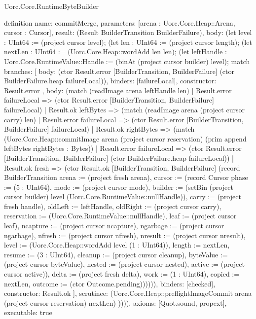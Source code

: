 \begin{lexlean}{Uorc.Core.RuntimeByteBuilder}
\begin{semanticmodule}
definition{
  name: commitMerge,
  parameters: [arena : Uorc.Core.Heap::Arena, cursor : Cursor],
  result: (Result BuilderTransition BuilderFailure),
  body: (let level : UInt64 := (project cursor level); (let len : UInt64 := (project cursor length); (let nextLen : UInt64 := (Uorc.Core.Heap::wordAdd len len); (let leftHandle : Uorc.Core.RuntimeValue::Handle := (binAt (project cursor builder) level); match{
    branches: [
      {
        body: (ctor Result.error [BuilderTransition, BuilderFailure] (ctor BuilderFailure.heap failureLocal)),
        binders: [failureLocal],
        constructor: Result.error
      },
      {
        body: (match (readImage arena leftHandle len)
          | Result.error failureLocal => (ctor Result.error [BuilderTransition, BuilderFailure] failureLocal)
          | Result.ok leftBytes => (match (readImage arena (project cursor carry) len)
            | Result.error failureLocal => (ctor Result.error [BuilderTransition, BuilderFailure] failureLocal)
            | Result.ok rightBytes => (match (Uorc.Core.Heap::commitImage arena (project cursor reservation) (prim append leftBytes rightBytes : Bytes))
              | Result.error failureLocal => (ctor Result.error [BuilderTransition, BuilderFailure] (ctor BuilderFailure.heap failureLocal))
              | Result.ok fresh => (ctor Result.ok [BuilderTransition, BuilderFailure] (record BuilderTransition {arena := (project fresh arena), cursor := (record Cursor {phase := (5 : UInt64), mode := (project cursor mode), builder := (setBin (project cursor builder) level (Uorc.Core.RuntimeValue::nullHandle)), carry := (project fresh handle), oldLeft := leftHandle, oldRight := (project cursor carry), reservation := (Uorc.Core.RuntimeValue::nullHandle), leaf := (project cursor leaf), ncapture := (project cursor ncapture), ngarbage := (project cursor ngarbage), nfresh := (project cursor nfresh), nresult := (project cursor nresult), level := (Uorc.Core.Heap::wordAdd level (1 : UInt64)), length := nextLen, resume := (3 : UInt64), cleanup := (project cursor cleanup), byteValue := (project cursor byteValue), nested := (project cursor nested), active := (project cursor active)}), delta := (project fresh delta), work := (1 : UInt64), copied := nextLen, outcome := (ctor Outcome.pending)}))))),
        binders: [checked],
        constructor: Result.ok
      }
    ],
    scrutinee: (Uorc.Core.Heap::preflightImageCommit arena (project cursor reservation) nextLen)
  })))),
  axioms: [Quot.sound, propext],
  executable: true
}


\end{semanticmodule}
\end{lexlean}

